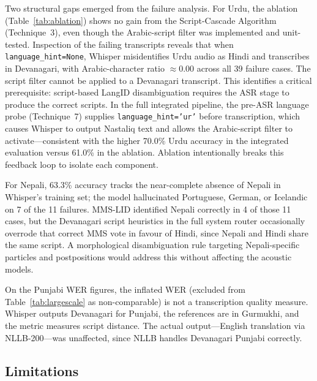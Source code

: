 \documentclass[12pt, onecolumn]{IEEEtran}
\begin{document}
Two structural gaps emerged from the failure analysis. For Urdu, the ablation (Table~\ref{tab:ablation}) shows no gain from the Script-Cascade Algorithm (Technique~3), even though the Arabic-script filter was implemented and unit-tested. Inspection of the failing transcripts reveals that when \texttt{language\_hint=None}, Whisper misidentifies Urdu audio as Hindi and transcribes in Devanagari, with Arabic-character ratio $\approx 0.00$ across all 39 failure cases. The script filter cannot be applied to a Devanagari transcript. This identifies a critical prerequisite: script-based LangID disambiguation requires the ASR stage to produce the correct scripts. In the full integrated pipeline, the pre-ASR language probe (Technique~7) supplies \texttt{language\_hint='ur'} before transcription, which causes Whisper to output Nastaliq text and allows the Arabic-script filter to activate---consistent with the higher 70.0\% Urdu accuracy in the integrated evaluation versus 61.0\% in the ablation. Ablation intentionally breaks this feedback loop to isolate each component.

For Nepali, 63.3\% accuracy tracks the near-complete absence of Nepali in Whisper's training set; the model hallucinated Portuguese, German, or Icelandic on 7 of the 11 failures. MMS-LID identified Nepali correctly in 4 of those 11 cases, but the Devanagari script heuristics in the full system router occasionally overrode that correct MMS vote in favour of Hindi, since Nepali and Hindi share the same script. A morphological disambiguation rule targeting Nepali-specific particles and postpositions would address this without affecting the acoustic models.

On the Punjabi WER figures, the inflated WER (excluded from Table~\ref{tab:largescale} as non-comparable) is not a transcription quality measure. Whisper outputs Devanagari for Punjabi, the references are in Gurmukhi, and the metric measures script distance. The actual output---English translation via NLLB-200---was unaffected, since NLLB handles Devanagari Punjabi correctly.

\subsection{Limitations}
\end{document}
